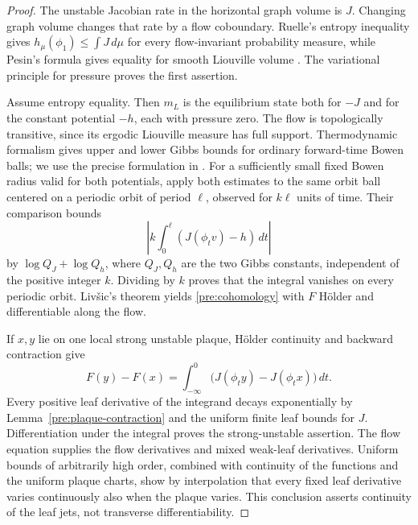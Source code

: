 \begin{proof}
The unstable Jacobian rate in the horizontal graph volume is $J$.
Changing graph volume changes that rate by a flow coboundary.
Ruelle's entropy inequality gives
$h_\mu(\phi_1)\le\int J\,d\mu$ for every flow-invariant probability
measure, while Pesin's formula gives equality for smooth Liouville
volume \citep{Ruelle1978,Pesin1977}. The variational principle for
pressure proves the first assertion.

Assume entropy equality. Then $m_L$ is the equilibrium state both
for $-J$ and for the constant potential $-h$, each with pressure
zero. The flow is topologically transitive, since its ergodic
Liouville measure has full support. Thermodynamic formalism
\citep{BowenRuelle1975} gives upper and lower Gibbs bounds for
ordinary forward-time Bowen balls; we use the precise formulation
in \citet[preprint version~2, Theorem~3.1 and Equation~(1.5)]{Climenhaga2024}.
For a sufficiently small fixed Bowen radius valid for both potentials,
apply both estimates to the same orbit ball centered on a periodic
orbit of period $\ell$, observed for $k\ell$ units of time.
Their comparison bounds
\[
 \left|k\int_0^\ell(J(\phi_t v)-h)\,dt\right|
\]
by $\log Q_J+\log Q_h$, where $Q_J,Q_h$ are the two Gibbs
constants, independent of the positive integer $k$. Dividing by
$k$ proves that the integral vanishes on every periodic orbit.
Livšic's theorem \citep{Livsic1972} yields
\eqref{pre:cohomology} with $F$ Hölder and differentiable along the
flow.

If $x,y$ lie on one local strong unstable plaque, Hölder continuity
and backward contraction give
\begin{equation}\label{pre:transfer-integral}
 F(y)-F(x)
 =\int_{-\infty}^{0}
       \bigl(J(\phi_t y)-J(\phi_t x)\bigr)\,dt.
\end{equation}
Every positive leaf derivative of the integrand decays exponentially
by Lemma~\ref{pre:plaque-contraction} and the uniform finite leaf
bounds for $J$. Differentiation under the integral proves the
strong-unstable assertion. The flow equation supplies the flow
derivatives and mixed weak-leaf derivatives. Uniform bounds of
arbitrarily high order, combined with continuity of the functions
and the uniform plaque charts, show by interpolation that every
fixed leaf derivative varies continuously also when the plaque
varies. This conclusion asserts continuity of the leaf jets, not
transverse differentiability.


\end{proof}
